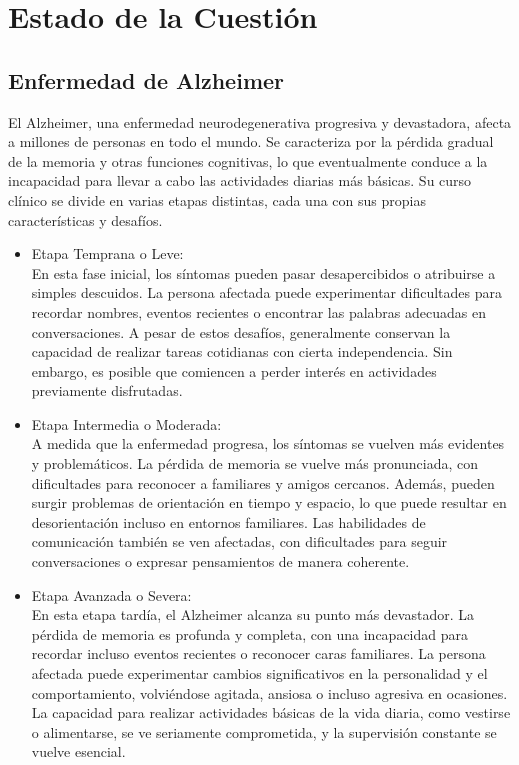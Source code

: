 \chapter{Estado de la Cuestión}
\label{cap:estadoDeLaCuestion}


\cite{notsoshort}

\section{Enfermedad de Alzheimer}
El Alzheimer, una enfermedad neurodegenerativa progresiva y devastadora, afecta a millones de personas en todo el mundo. Se caracteriza por la pérdida gradual de la memoria y otras funciones cognitivas, lo que eventualmente conduce a la incapacidad para llevar a cabo las actividades diarias más básicas. Su curso clínico se divide en varias etapas distintas, cada una con sus propias características y desafíos.
\begin{itemize}
\item Etapa Temprana o Leve:\\
En esta fase inicial, los síntomas pueden pasar desapercibidos o atribuirse a simples descuidos. La persona afectada puede experimentar dificultades para recordar nombres, eventos recientes o encontrar las palabras adecuadas en conversaciones. A pesar de estos desafíos, generalmente conservan la capacidad de realizar tareas cotidianas con cierta independencia. Sin embargo, es posible que comiencen a perder interés en actividades previamente disfrutadas.

\item Etapa Intermedia o Moderada:\\
A medida que la enfermedad progresa, los síntomas se vuelven más evidentes y problemáticos. La pérdida de memoria se vuelve más pronunciada, con dificultades para reconocer a familiares y amigos cercanos. Además, pueden surgir problemas de orientación en tiempo y espacio, lo que puede resultar en desorientación incluso en entornos familiares. Las habilidades de comunicación también se ven afectadas, con dificultades para seguir conversaciones o expresar pensamientos de manera coherente.

\item Etapa Avanzada o Severa:\\
En esta etapa tardía, el Alzheimer alcanza su punto más devastador. La pérdida de memoria es profunda y completa, con una incapacidad para recordar incluso eventos recientes o reconocer caras familiares. La persona afectada puede experimentar cambios significativos en la personalidad y el comportamiento, volviéndose agitada, ansiosa o incluso agresiva en ocasiones. La capacidad para realizar actividades básicas de la vida diaria, como vestirse o alimentarse, se ve seriamente comprometida, y la supervisión constante se vuelve esencial.
\end{itemize}

